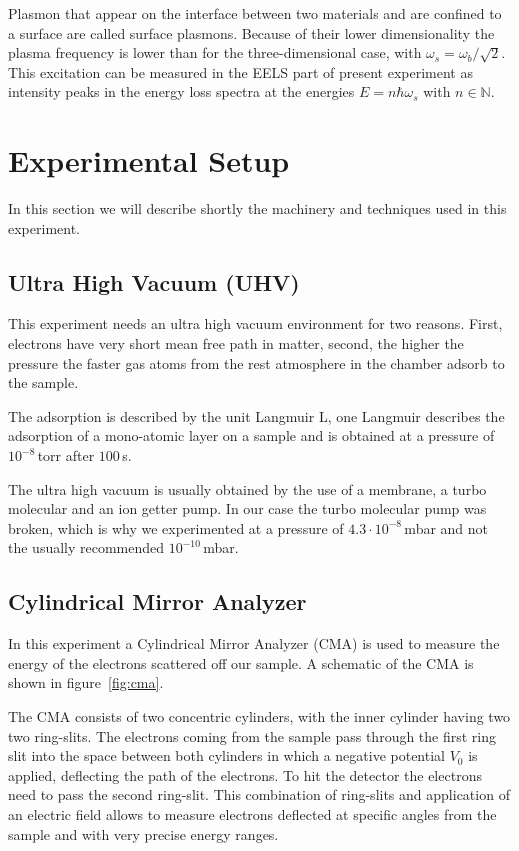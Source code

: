 \documentclass[a4paper,10pt]{scrartcl}
\begin{document}
Plasmon that appear on the interface between two materials and are confined to a surface are called surface plasmons. Because of their lower dimensionality the plasma frequency is lower than for the three-dimensional case, with $\omega_{s} = \omega_{b}/\sqrt{2}$. This excitation can be measured in the EELS part of present experiment as intensity peaks in the energy loss spectra at the energies $E=n \hbar \omega_{s}$ with $n \in \mathbb{N}$.

\section{Experimental Setup}

In this section we will describe shortly the machinery and techniques used in this experiment.

\subsection{Ultra High Vacuum (UHV)}

This experiment needs an ultra high vacuum environment for two reasons. First, electrons have very short mean free path in matter, second, the higher the pressure the faster gas atoms from the rest atmosphere in the chamber adsorb to the sample.

The adsorption is described by the unit Langmuir L, one Langmuir describes the adsorption of a mono-atomic layer on a sample and is obtained at a pressure of $10^{-8}\,$torr after $100\,$s.

The ultra high vacuum is usually obtained by the use of a membrane, a turbo molecular and an ion getter pump. In our case the turbo molecular pump was broken, which is why we experimented at a pressure of $4.3 \cdot 10^{-8}\,$mbar and not the usually recommended $10^{-10}\,$mbar.

\subsection{Cylindrical Mirror Analyzer}

In this experiment a Cylindrical Mirror Analyzer (CMA) is used to measure the energy of the electrons scattered off our sample. A schematic of the CMA is shown in figure~\ref{fig:cma}.

The CMA consists of two concentric cylinders, with the inner cylinder having two two ring-slits. The electrons coming from the sample pass through the first ring slit into the space between both cylinders in which a negative potential $V_{0}$ is applied, deflecting the path of the electrons. To hit the detector the electrons need to pass the second ring-slit. This combination of ring-slits and application of an electric field allows to measure electrons deflected at specific angles from the sample and with very precise energy ranges.
\end{document}
